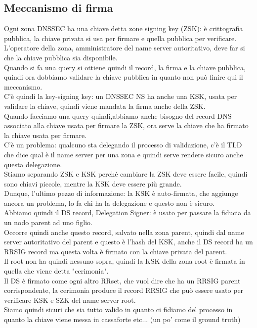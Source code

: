 \documentclass[12pt, oneside]{extbook} %
\begin{document}
\subsection{Meccanismo di firma}
Ogni zona DNSSEC ha una chiave detta zone signing key (ZSK): è crittografia pubblica, la chiave privata si usa per firmare e quella pubblica per verificare.
\\L'operatore della zona, amministratore del name server autoritativo, deve far si che la chiave pubblica sia disponibile.
\\Quando si fa una query si ottiene quindi il record, la firma e la chiave pubblica, quindi ora dobbiamo validare la chiave pubblica in quanto non può finire qui il meccanismo.
\\C'è quindi la key-signing key: un DNSSEC NS ha anche una KSK, usata per validare la chiave, quindi viene mandata la firma anche della ZSK.
\\Quando facciamo una query quindi,abbiamo anche bisogno del record DNS associato alla chiave usata per firmare la ZSK, ora serve la chiave che ha firmato la chiave usata per firmare.
\\C'è un problema: qualcuno sta delegando il processo di validazione, c'è il TLD che dice qual è il name server per una zona e quindi serve rendere sicuro anche questa delegazione.
\\Stiamo separando ZSK e KSK perché cambiare la ZSK deve essere facile, quindi sono chiavi piccole, mentre la KSK deve essere più grande.
\\Dunque, l'ultimo pezzo di informazione: la KSK è auto-firmata, che aggiunge ancora un problema, lo fa chi ha la delegazione e questo non è sicuro.
\\Abbiamo quindi il DS record, Delegation Signer: è usato per passare la fiducia da un nodo parent ad uno figlio.
\\Occorre quindi anche questo record, salvato nella zona parent, quindi dal name server autoritativo del parent e questo è l'hash del KSK, anche il DS record ha un RRSIG record ma questa volta è firmato con la chiave privata del parent.
\\Il root non ha quindi nessuno sopra, quindi la KSK della zona root è firmata in quella che viene detta "cerimonia".
\\Il DS è firmato come ogni altro RRset, che vuol dire che ha un RRSIG parent corrispondente, la cerimonia produce il record RRSIG che può essere usato per verificare KSK e SZK del name server root.
\\Siamo quindi sicuri che sia tutto valido in quanto ci fidiamo del processo in quanto la chiave viene messa in cassaforte etc... (un po' come il ground truth)
\end{document}

